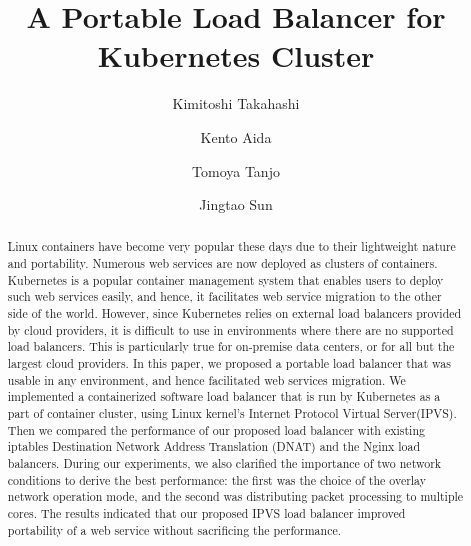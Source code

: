 \documentclass[sigconf]{acmart}
\begin{document}
\title{A Portable Load Balancer for Kubernetes Cluster}

\author{Kimitoshi Takahashi}

\author{Kento Aida}

\author{Tomoya Tanjo}

\author{Jingtao Sun}

\renewcommand{\shortauthors}{K. Takahashi et al.}


\begin{abstract}
Linux containers have become very popular these days due to their lightweight nature and portability. 
Numerous web services are now deployed as clusters of containers. 
%
Kubernetes is a popular container management system that enables users to deploy such web services easily, and hence, 
it facilitates web service migration to the other side of the world.
%
However, since Kubernetes relies on external load balancers provided by cloud providers, 
it is difficult to use in environments where there are no supported load balancers.
%
This is particularly true for on-premise data centers, or for all but the largest cloud providers.
%
In this paper, we proposed a portable load balancer that was usable in any environment, and hence facilitated web services migration.
%
We implemented a containerized software load balancer that is run by Kubernetes as a part of container cluster, 
using Linux kernel's Internet Protocol Virtual Server(IPVS).
%
Then we compared the performance of our proposed load balancer with existing iptables Destination Network Address 
Translation (DNAT) and the Nginx load balancers.
%
During our experiments, we also clarified the importance of two network conditions to derive the best performance: 
the first was the choice of the overlay network operation mode, and the second was distributing packet processing to multiple cores.
%
The results indicated that our proposed IPVS load balancer improved portability of a web service without sacrificing the performance.
%
\end{abstract}
\end{document}

